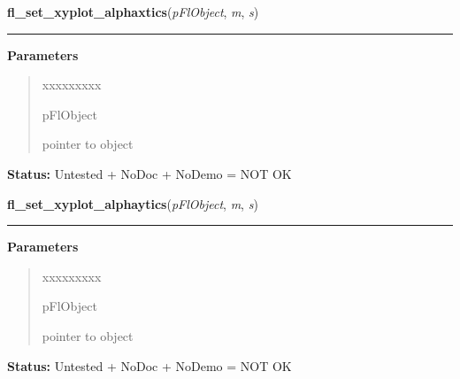     \vspace{0.5ex}

\hspace{.8\funcindent}\begin{boxedminipage}{\funcwidth}

    \raggedright \textbf{fl\_set\_xyplot\_alphaxtics}(\textit{pFlObject}, \textit{m}, \textit{s})

    \vspace{-1.5ex}

    \rule{\textwidth}{0.5\fboxrule}
\setlength{\parskip}{2ex}
\setlength{\parskip}{1ex}
      \textbf{Parameters}
      \vspace{-1ex}

      \begin{quote}
        \begin{Ventry}{xxxxxxxxx}

          \item[pFlObject]

          pointer to object

        \end{Ventry}

      \end{quote}

\textbf{Status:} Untested + NoDoc + NoDemo = NOT OK



    \end{boxedminipage}

    \label{xformslib:flxyplot:fl_set_xyplot_alphaytics}

    \vspace{0.5ex}

\hspace{.8\funcindent}\begin{boxedminipage}{\funcwidth}

    \raggedright \textbf{fl\_set\_xyplot\_alphaytics}(\textit{pFlObject}, \textit{m}, \textit{s})

    \vspace{-1.5ex}

    \rule{\textwidth}{0.5\fboxrule}
\setlength{\parskip}{2ex}
\setlength{\parskip}{1ex}
      \textbf{Parameters}
      \vspace{-1ex}

      \begin{quote}
        \begin{Ventry}{xxxxxxxxx}

          \item[pFlObject]

          pointer to object

        \end{Ventry}

      \end{quote}

\textbf{Status:} Untested + NoDoc + NoDemo = NOT OK



    \end{boxedminipage}

